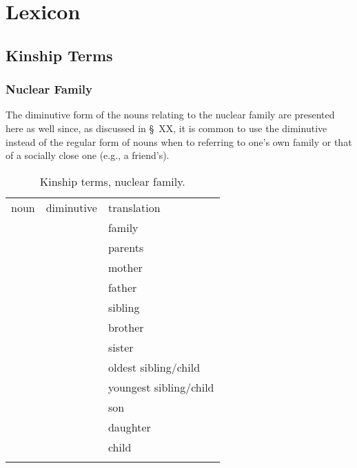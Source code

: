 \chapter{Lexicon}

\section{Kinship Terms}\label{sec:kinship terms}
\subsection{Nuclear Family}\label{sec:nuclear family}

The diminutive form of the nouns relating to the nuclear family are presented here as well since, as discussed in \S~XX, it is common to use the diminutive instead of the regular form of nouns when to referring to one's own family or that of a socially close one (e.g., a friend's).


\begin{table}[h!]
  \caption{Kinship terms, nuclear family.}
  \label{tbl:kinship}
  \centering\small
  \begin{tabu} to 0.8\textwidth{YYY[1.5]}
  \toprule\addlinespace
  {\sc noun}    & {\sc diminutive} & {\sc translation}\\\addlinespace
  \midrule\addlinespace
      &  & family\\\addlinespace
      &        & parents\\\addlinespace
      &      & mother\\\addlinespace
    &      & father\\\addlinespace
      &      & sibling\\\addlinespace
      &      & brother\\\addlinespace
      &      & sister\\\addlinespace
      &      & oldest sibling/child\\\addlinespace
      &      & youngest sibling/child\\\addlinespace
      &      & son\\\addlinespace
      &      & daughter\\\addlinespace
      &      & child\\\addlinespace

  \bottomrule

  \end{tabu}
\end{table}
